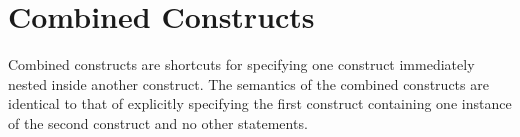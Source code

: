 %
%
%
%
%
%
%
%
%
%
%
%
%


\section{Combined Constructs}
\label{sec:Combined Constructs}
Combined constructs are shortcuts for specifying one construct immediately nested
inside another construct. The semantics of the combined constructs are identical 
to that of explicitly specifying the first construct containing one instance of 
the second construct and no other statements.

